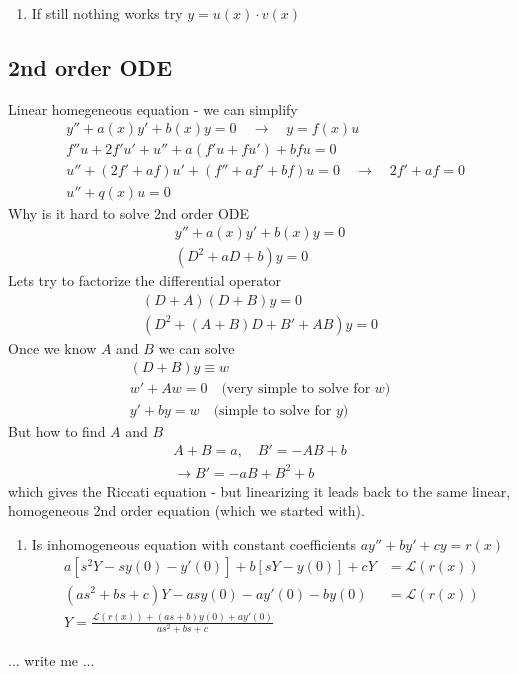 \documentclass[../main.tex]{subfiles}
\begin{document}
\begin{enumerate}
\item If still nothing works try $y=u(x)\cdot v(x)$
\end{enumerate}

\subsection{2nd order ODE}
Linear homegeneous equation - we can simplify
\begin{align}
&y''+a(x)y'+b(x)y=0 \quad\rightarrow\quad y=f(x)u\\
&f''u+2f'u'+u''+a(f'u+fu')+bfu=0\\
&u''+(2f'+af)u'+(f''+af'+bf)u=0\quad\rightarrow\quad 2f'+af=0\\
&u''+q(x)u=0
\end{align}
Why is it hard to solve 2nd order ODE
\begin{align}
y''+a(x)y'+b(x)y=0\\
(D^2+aD+b)y=0
\end{align}
Lets try to factorize the differential operator
\begin{align}
(D+A)(D+B)y=0\\
(D^2+(A+B)D+B'+AB)y=0
\end{align}
Once we know $A$ and $B$ we can solve
\begin{align}
(D+B)y\equiv w\\
w'+Aw=0 \quad\text{(very simple to solve for $w$)}\\
y'+by=w \quad\text{(simple to solve for $y$)}
\end{align}
But how to find $A$ and $B$
\begin{align}
A+B=a, \quad B'=-AB+b\\
\rightarrow B'=-aB+B^2+b
\end{align}
which gives the Riccati equation - but linearizing it leads back to the same linear, homogeneous 2nd order equation (which we started with).

\begin{enumerate}
\item Is inhomogeneous equation with constant coefficients $ay''+by'+cy=r(x)$
\begin{align}
a[s^2Y-sy(0)-y'(0)]+b[sY-y(0)]+cY&=\mathcal{L}(r(x))\\
(as^2+bs+c)Y-asy(0)-ay'(0)-by(0)&=\mathcal{L}(r(x))\\
Y=\frac{\mathcal{L}(r(x))+(as+b)y(0)+ay'(0)}{as^2+bs+c}
\end{align}

\end{enumerate}
... write me ...
\end{document}
